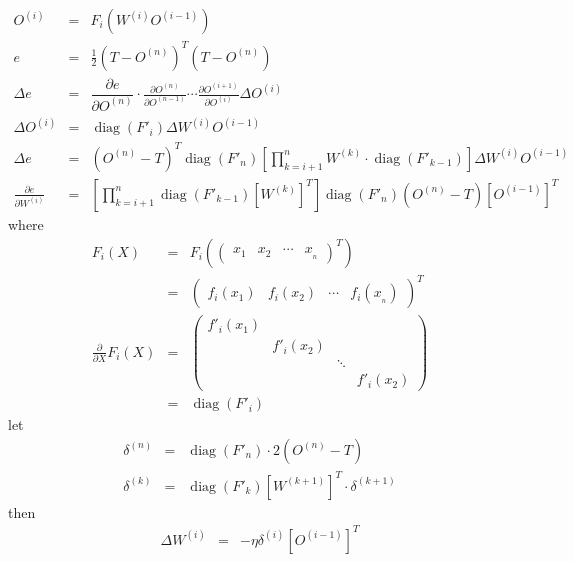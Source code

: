 \documentclass{article}
\newcommand{\cdummy}{\cdot}
\newcommand{\tmop}[1]{\ensuremath{\operatorname{#1}}}
\begin{document}
\begin{eqnarray*}
  O^{( i )} & = & F_{i} ( W^{( i )} O^{( i-1 )} )\\
  e & = & \frac{1}{2} ( T-O^{( n )} )^{T} ( T-O^{( n )} )\\
  \Delta e & = & \dfrac{\partial e}{\partial O^{( n )}} \cdummy \frac{\partial
  O^{( n )}}{\partial O^{( n-1 )}} \cdots \frac{\partial O^{( i+1 )}}{\partial
  O^{( i )}} \Delta O^{( i )}\\
  \Delta O^{( i )} & = & \tmop{diag} ( F'_{i} ) \Delta W^{( i )} O^{( i-1 )}\\
  \Delta e & = & ( O^{( n )} -T )^{T} \tmop{diag} ( F'_{n} ) \left[
  \prod^{n}_{k=i+1} W^{( k )} \cdummy \tmop{diag} ( F'_{k-1} ) \right] \Delta
  W^{( i )} O^{( i-1 )}\\
  \frac{\partial e}{\partial W^{( i )}} & = & \left[ \prod^{n}_{k=i+1}
  \tmop{diag} ( F'_{k-1} ) [ W^{( k )} ]^{T} \right] \tmop{diag} ( F'_{n} ) (
  O^{( n )} -T ) [ O^{( i-1 )} ]^{T}
\end{eqnarray*}
where
\begin{eqnarray*}
  F_{i} ( X ) & = & F_{i} \left( \left(\begin{array}{cccc}
    x_{1} & x_{2} & \cdots & x_{_{n}}
  \end{array}\right)^{T} \right)\\
  & = & \left(\begin{array}{cccc}
    f_{i} ( x_{1} ) & f_{i} ( x_{2} ) & \cdots & f_{i} ( x_{_{n}} )
  \end{array}\right)^{T}\\
  \frac{\partial}{\partial X} F_{i} ( X ) & = & \left(\begin{array}{cccc}
    f'_{i} ( x_{1} ) &  &  & \\
    & f'_{i} ( x_{2} ) &  & \\
    &  & \ddots & \\
    &  &  & f'_{i} ( x_{2} )
  \end{array}\right)\\
  & = & \tmop{diag} ( F'_{i} )
\end{eqnarray*}
let
\begin{eqnarray*}
  \delta^{( n )} & = & \tmop{diag} ( F'_{n} ) \cdummy 2 ( O^{( n )} -T )\\
  \delta^{( k )} & = & \tmop{diag} ( F'_{k} ) [ W^{( k+1 )} ]^{T} \cdummy
  \delta^{( k+1 )}
\end{eqnarray*}
then
\begin{eqnarray*}
  \Delta W^{( i )} & = & - \eta \delta^{( i )} [ O^{( i-1 )} ]^{T}
\end{eqnarray*}
\end{document}
